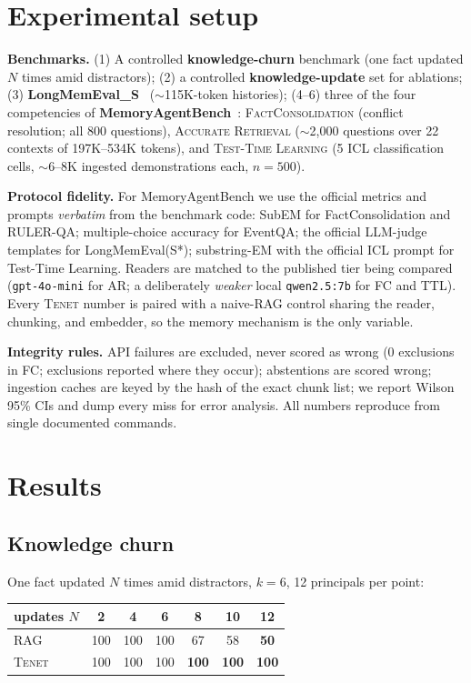 \documentclass[11pt]{article}
\newcommand{\tenet}{\textsc{Tenet}}
\begin{document}
\section{Experimental setup}\label{sec:setup}
\textbf{Benchmarks.} (1) A controlled \textbf{knowledge-churn} benchmark (one fact updated
$N$ times amid distractors); (2) a controlled \textbf{knowledge-update} set for ablations;
(3) \textbf{LongMemEval\_S}~\cite{longmemeval} ($\sim$115K-token histories); (4--6) three
of the four competencies of \textbf{MemoryAgentBench}~\cite{mab}:
\textsc{FactConsolidation} (conflict resolution; all 800 questions),
\textsc{Accurate Retrieval} ($\sim$2{,}000 questions over 22 contexts of 197K--534K
tokens), and \textsc{Test-Time Learning} (5 ICL classification cells, $\sim$6--8K
ingested demonstrations each, $n{=}500$).

\textbf{Protocol fidelity.} For MemoryAgentBench we use the official metrics and prompts
\emph{verbatim} from the benchmark code: SubEM for FactConsolidation and RULER-QA;
multiple-choice accuracy for EventQA; the official LLM-judge templates for
LongMemEval(S*); substring-EM with the official ICL prompt for Test-Time Learning.
Readers are matched to the published tier being compared
(\texttt{gpt-4o-mini} for AR; a deliberately \emph{weaker} local \texttt{qwen2.5:7b} for
FC and TTL). Every \tenet{} number is paired with a naive-RAG control sharing the reader,
chunking, and embedder, so the memory mechanism is the only variable.

\textbf{Integrity rules.} API failures are excluded, never scored as wrong (0 exclusions
in FC; exclusions reported where they occur); abstentions are scored wrong; ingestion
caches are keyed by the hash of the exact chunk list; we report Wilson 95\% CIs and dump
every miss for error analysis. All numbers reproduce from single documented commands.

\section{Results}\label{sec:results}

\subsection{Knowledge churn}\label{sec:churn}
One fact updated $N$ times amid distractors, $k=6$, 12 principals per point:

\begin{center}
\begin{tabular}{lcccccc}
\toprule
updates $N$ & 2 & 4 & 6 & 8 & 10 & 12\\
\midrule
RAG & 100 & 100 & 100 & 67 & 58 & \textbf{50}\\
\tenet{} & 100 & 100 & 100 & \textbf{100} & \textbf{100} & \textbf{100}\\
\bottomrule
\end{tabular}
\end{center}
\end{document}
